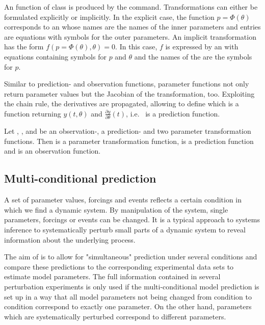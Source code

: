 \documentclass[article]{jss}
\begin{document}
An  function of class  is produced by the  command. Transformations can either be formulated explicitly or implicitly. In the explicit case, the function $p = \Phi(\theta)$ corresponds to an  whose names are the names of the inner parameters and entries are equations with symbols for the outer parameters. An implicit transformation has the form $f(p = \Phi(\theta), \theta) = 0$. In this case, $f$ is expressed by an  with equations containing symbols for $p$ and $\theta$ and the names of the  are the symbols for $p$.

Similar to prediction- and observation functions, parameter functions not only return parameter values but the Jacobian of the transformation, too. Exploiting the chain rule, the derivatives are propagated, allowing to define  which is a function returning $y(t, \theta)$ and $\frac{\partial y}{\partial \theta}(t)$, i.e.~ is a prediction function.

Let , ,  and  be an observation-, a prediction- and two parameter transformation functions. Then  is a parameter transformation function,  is a prediction function and  is an observation function.

\subsection{Multi-conditional prediction}

A set of parameter values, forcings and events reflects a certain condition in which we find a dynamic system. By manipulation of the system, single parameters, forcings or events can be changed. It is a typical approach to systems inference to systematically perturb small parts of a dynamic system to reveal information about the underlying process. 

The aim of  is to allow for "simultaneous" prediction under several conditions and compare these predictions to the corresponding experimental data sets to estimate model parameters. The full information contained in several perturbation experiments is only used if the multi-conditional model prediction is set up in a way that all model parameters not being changed from condition to condition correspond to exactly one parameter. On the other hand, parameters which are systematically perturbed correspond to different parameters.
\end{document}
